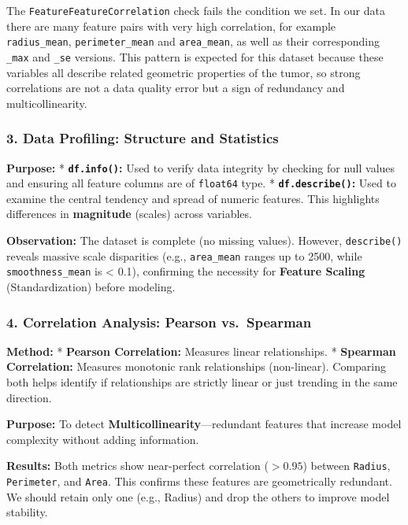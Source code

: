\documentclass[
  letterpaper,
  DIV=11,
  numbers=noendperiod]{scrartcl}
\begin{document}
The \texttt{FeatureFeatureCorrelation} check fails the condition we set.
In our data there are many feature pairs with very high correlation, for
example \texttt{radius\_mean}, \texttt{perimeter\_mean} and
\texttt{area\_mean}, as well as their corresponding \texttt{\_max} and
\texttt{\_se} versions. This pattern is expected for this dataset
because these variables all describe related geometric properties of the
tumor, so strong correlations are not a data quality error but a sign of
redundancy and multicollinearity.

\subsubsection{3. Data Profiling: Structure and
Statistics}\label{data-profiling-structure-and-statistics}

\textbf{Purpose:} * \textbf{\texttt{df.info()}:} Used to verify data
integrity by checking for null values and ensuring all feature columns
are of \texttt{float64} type. * \textbf{\texttt{df.describe()}:} Used to
examine the central tendency and spread of numeric features. This
highlights differences in \textbf{magnitude} (scales) across variables.

\textbf{Observation:} The dataset is complete (no missing values).
However, \texttt{describe()} reveals massive scale disparities (e.g.,
\texttt{area\_mean} ranges up to 2500, while \texttt{smoothness\_mean}
is \textless{} 0.1), confirming the necessity for \textbf{Feature
Scaling} (Standardization) before modeling.

\subsubsection{4. Correlation Analysis: Pearson
vs.~Spearman}\label{correlation-analysis-pearson-vs.-spearman}

\textbf{Method:} * \textbf{Pearson Correlation:} Measures linear
relationships. * \textbf{Spearman Correlation:} Measures monotonic rank
relationships (non-linear). Comparing both helps identify if
relationships are strictly linear or just trending in the same
direction.

\textbf{Purpose:} To detect \textbf{Multicollinearity}---redundant
features that increase model complexity without adding information.

\textbf{Results:} Both metrics show near-perfect correlation (\(>0.95\))
between \texttt{Radius}, \texttt{Perimeter}, and \texttt{Area}. This
confirms these features are geometrically redundant. We should retain
only one (e.g., Radius) and drop the others to improve model stability.
\end{document}
